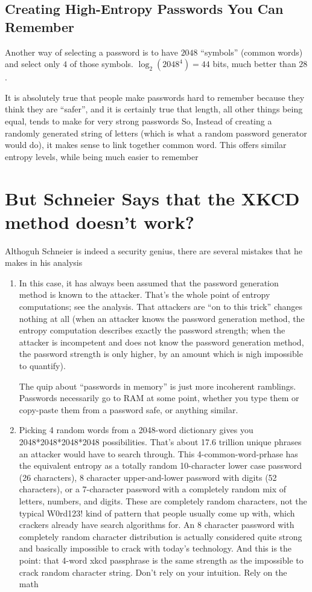 \documentclass{scrartcl}
\begin{document}
\subsection{Creating High-Entropy Passwords You Can Remember}
\label{sec:orge41e2f7}
Another way of selecting a password is to have \(2048\) ``symbols'' (common words) and
select only \(4\) of those symbols. \(\log_{2}(2048^{4})=44\) bits, much better than \(28\).

It is absolutely true that people make passwords hard to remember because they
think they are ``safer'', and it is certainly true that length, all other things
being equal, tends to make for very strong passwords So, Instead of creating a
randomly generated string of letters (which is what a random password generator
would do), it makes sense to link together common word. This offers similar
entropy levels, while being much easier to remember

\section{But Schneier Says that the XKCD method doesn't work?}
\label{sec:org400c400}
Althoguh Schneier is indeed a security genius, there are several mistakes that
he makes in his analysis

\begin{enumerate}
\item In this case, it has always been assumed that the password generation method
is known to the attacker. That's the whole point of entropy computations; see
the analysis. That attackers are ``on to this trick'' changes nothing at all
(when an attacker knows the password generation method, the entropy
computation describes exactly the password strength; when the attacker is
incompetent and does not know the password generation method, the password
strength is only higher, by an amount which is nigh impossible to quantify).

The quip about ``passwords in memory'' is just more incoherent ramblings.
Passwords necessarily go to RAM at some point, whether you type them or
copy-paste them from a password safe, or anything similar.

\item Picking 4 random words from a 2048-word dictionary gives you
2048*2048*2048*2048 possibilities. That's about 17.6 trillion unique phrases
an attacker would have to search through. This
4-common-word-prhase has the equivalent entropy as a totally random
10-character lower case password (26 characters), 8 character upper-and-lower
password with digits (52 characters), or a 7-character password with a
completely random mix of letters, numbers, and digits. These are completely
random characters, not the typical W0rd123! kind of pattern that people
usually come up with, which crackers already have search algorithms for. An 8
character password with completely random character distribution is actually
considered quite strong and basically impossible to crack with today's
technology. And this is the point: that 4-word xkcd passphrase is the same
strength as the impossible to crack random character string. Don't rely on
your intuition. Rely on the math
\end{enumerate}
\end{document}
